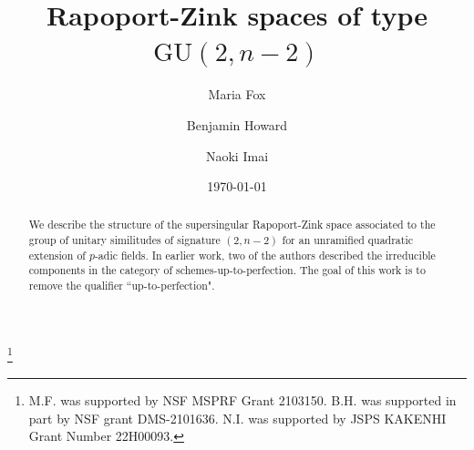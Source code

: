 \documentclass[11pt]{alggeom}
\begin{document}
\title{Rapoport-Zink spaces of type $\mathrm{GU}(2,n-2)$}
\date{\today}




\author{Maria Fox}
\address{Department of Mathematics, Oklahoma State University, Stillwater, OK 74078, USA}


\author{Benjamin Howard}
\address{Department of Mathematics, Boston College, 140 Commonwealth Ave, Chestnut Hill, MA 02467, USA}


\author{Naoki Imai}
\address
{Graduate School of Mathematical Sciences, The University of Tokyo, 3-8-1 Komaba, Meguro-ku, Tokyo, 153-8914, Japan}


\thanks{
M.F. was supported by NSF MSPRF Grant
2103150. B.H. was supported in part by NSF grant DMS-2101636. N.I. was supported by JSPS KAKENHI Grant Number 22H00093. 
}



              


\begin{abstract}
We describe the structure of the supersingular Rapoport-Zink space associated to the group of unitary similitudes of signature $(2,n-2)$ for an unramified quadratic extension of  $p$-adic fields.
In earlier work, two of the authors described the irreducible components in the category of schemes-up-to-perfection.  
The goal of this work is to remove the qualifier ``up-to-perfection".
\end{abstract}




\maketitle


\setcounter{tocdepth}{1}
\tableofcontents

\theoremstyle{plain}
\newtheorem{theorem}{Theorem}[subsection]
\newtheorem{bigtheorem}{Theorem}
\newtheorem{proposition}[theorem]{Proposition}
\newtheorem{lemma}[theorem]{Lemma}
\newtheorem{corollary}[theorem]{Corollary}
\newtheorem{conjecture}[theorem]{Conjecture}


\theoremstyle{definition}
\newtheorem{definition}[theorem]{Definition}
\newtheorem{hypothesis}[theorem]{Hypothesis}

\theoremstyle{remark}
\newtheorem{remark}[theorem]{Remark}
\newtheorem{example}[theorem]{Example}
\newtheorem{question}[theorem]{Question}
\end{document}

